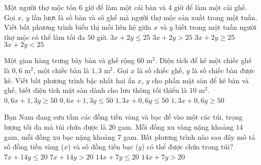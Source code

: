 \begin{ex}%
	Một người thợ mộc tốn $6$ giờ để làm một cái bàn và $4$ giờ để làm một cái ghế. Gọi $x$, $y$ lần lượt là số bàn và số ghế mà người thợ mộc sản xuất trong một tuần. Viết bất phương trình biểu thị mối liên hệ giữa $x$ và $y$ biết trong một tuần người thợ mộc có thể làm tối đa $50$ giờ.
	\choice
	{\True $3x+2y\le 25$}
	{$3x+2y> 25$}
	{$3x+2y\ge 25$}
	{$3x+2y< 25$}
\end{ex}
\begin{ex}%
	Một gian hàng trưng bày bàn và ghế rộng $60$ m$^2$. Diện tích để kê một chiếc ghế là $0{,}6$ m$^2$, một chiếc bàn là $1{,}3$ m$^2$. Gọi $x$ là số chiếc ghế, $y$ là số chiếc bàn được kê. Viết bất phương trình bậc nhất hai ẩn $x$, $y$ cho phần mặt sàn để kê bàn và ghế, biết diện tích mặt sàn dành cho lưu thông tối thiểu là $10$ m$^2$.
	\choice
	{$0{,}6x+1{,}3y\ge 50$}
	{\True $0{,}6x+1{,}3y\le 50$}
	{$1{,}3x+0{,}6y\le 50$}
	{$1{,}3x+0{,}6y\ge 50$}
\end{ex}
\begin{ex}%
	Bạn Nam đang sưu tầm các đồng tiền vàng và bạc để vào một các túi, trọng lượng tối đa mà túi chứa được là $20$ gam. Mỗi đồng xu vàng nặng khoảng $14$ gam, mỗi đồng xu bạc nặng khoảng $7$ gam. Bất phương trình nào sau đây mô tả số đồng tiền vàng ($x$) và số đồng tiền bạc ($y$) có thể được chứa trong túi?
	\choice
	{$7x+14y\le 20$}
	{$7x+14y>20$}
	{\True $14x+7y\le 20$}
	{$14x+7y>20$}
\end{ex}
